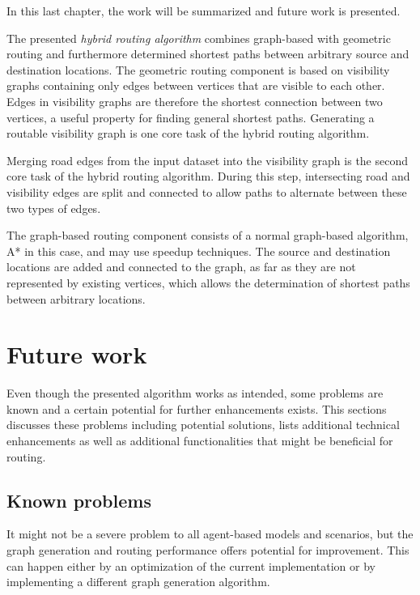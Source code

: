 

In this last chapter, the work will be summarized and future work is presented.

The presented \emph{hybrid routing algorithm} combines graph-based with geometric routing and furthermore determined shortest paths between arbitrary source and destination locations.
The geometric routing component is based on visibility graphs containing only edges between vertices that are visible to each other.
Edges in visibility graphs are therefore the shortest connection between two vertices, a useful property for finding general shortest paths.
Generating a routable visibility graph is one core task of the hybrid routing algorithm.

Merging road edges from the input dataset into the visibility graph is the second core task of the hybrid routing algorithm.
During this step, intersecting road and visibility edges are split and connected to allow paths to alternate between these two types of edges.

The graph-based routing component consists of a normal graph-based algorithm, A* in this case, and may use speedup techniques.
The source and destination locations are added and connected to the graph, as far as they are not represented by existing vertices, which allows the determination of shortest paths between arbitrary locations.
	
\section{Future work}
\label{sec:future-work}

	Even though the presented algorithm works as intended, some problems are known and a certain potential for further enhancements exists.
	This sections discusses these problems including potential solutions, lists additional technical enhancements as well as additional functionalities that might be beneficial for routing.

	\subsection{Known problems}
		It might not be a severe problem to all agent-based models and scenarios, but the graph generation and routing performance offers potential for improvement.
		This can happen either by an optimization of the current implementation or by implementing a different graph generation algorithm.
		
